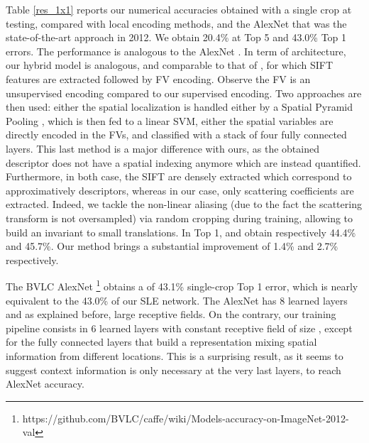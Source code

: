 \documentclass[10pt,twocolumn,letterpaper]{article}
\begin{document}
Table \ref{res_1x1} reports our numerical accuracies obtained with a single crop at testing, compared with local encoding methods, and the AlexNet that was the state-of-the-art approach in 2012. We obtain 20.4\% at Top 5 and 43.0\% Top 1 errors. The performance is analogous to the AlexNet \cite{krizhevsky2012imagenet}. In term of architecture, our hybrid model is analogous, and comparable to that of \cite{sanchez2011high,perronnin2015fisher}, for which SIFT features are extracted followed by FV \cite{sanchez2013image}  encoding. Observe the FV is an unsupervised encoding compared to our supervised encoding. Two approaches are then used: either the  spatial localization is handled either by a Spatial Pyramid Pooling \cite{lazebnik2006beyond}, which is then fed to a linear SVM, either the spatial variables are directly encoded in the FVs, and classified with a stack of four fully connected layers. This last method is a major difference with ours, as the obtained descriptor does not have a spatial indexing  anymore which are instead quantified. Furthermore, in both case, the SIFT are densely extracted which correspond to approximatively  descriptors, whereas in our case, only  scattering coefficients are extracted. Indeed, we tackle the non-linear aliasing (due to the fact the scattering transform is not oversampled) via random cropping during training, allowing to build an invariant to small translations. In Top 1, \cite{sanchez2011high} and \cite{perronnin2015fisher} obtain respectively 44.4\% and 45.7\%. Our method brings a substantial improvement of 1.4\% and 2.7\% respectively.

The BVLC AlexNet \footnote{https://github.com/BVLC/caffe/wiki/Models-accuracy-on-ImageNet-2012-val} obtains a  of 43.1\%  single-crop Top 1  error, which is nearly equivalent to the 43.0\% of our SLE network. The AlexNet has 8 learned layers and as explained before, large receptive fields. On the contrary, our training pipeline consists in 6 learned layers with constant receptive field of size , except for the fully connected layers that build a  representation mixing spatial information from different locations. This is a surprising result, as it seems to suggest context information is only necessary at the very last layers, to reach AlexNet accuracy.
\end{document}
